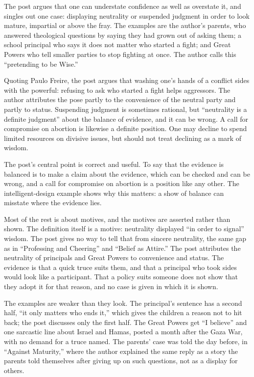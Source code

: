 \begin{afterword}
\summaryhead

The post argues that one can understate confidence as well as overstate it, and singles out one case: displaying neutrality or suspended judgment in order to look mature, impartial or above the fray. The examples are the author's parents, who answered theological questions by saying they had grown out of asking them; a school principal who says it does not matter who started a fight; and Great Powers who tell smaller parties to stop fighting at once. The author calls this ``pretending to be Wise.''

Quoting Paulo Freire, the post argues that washing one's hands of a conflict sides with the powerful: refusing to ask who started a fight helps aggressors. The author attributes the pose partly to the convenience of the neutral party and partly to status. Suspending judgment is sometimes rational, but ``neutrality is a definite judgment'' about the balance of evidence, and it can be wrong. A call for compromise on abortion is likewise a definite position. One may decline to spend limited resources on divisive issues, but should not treat declining as a mark of wisdom.

\responsehead

The post's central point is correct and useful. To say that the evidence is balanced is to make a claim about the evidence, which can be checked and can be wrong, and a call for compromise on abortion is a position like any other. The intelligent-design example shows why this matters: a show of balance can misstate where the evidence lies.

Most of the rest is about motives, and the motives are asserted rather than shown. The definition itself is a motive: neutrality displayed ``in order to signal'' wisdom. The post gives no way to tell that from sincere neutrality, the same gap as in ``Professing and Cheering'' and ``Belief as Attire.'' The post attributes the neutrality of principals and Great Powers to convenience and status. The evidence is that a quick truce suits them, and that a principal who took sides would look like a participant. That a policy suits someone does not show that they adopt it for that reason, and no case is given in which it is shown.

The examples are weaker than they look. The principal's sentence has a second half, ``it only matters who ends it,'' which gives the children a reason not to hit back; the post discusses only the first half. The Great Powers get ``I believe'' and one sarcastic line about Israel and Hamas, posted a month after the Gaza War, with no demand for a truce named. The parents' case was told the day before, in ``Against Maturity,'' where the author explained the same reply as a story the parents told themselves after giving up on such questions, not as a display for others.


\end{afterword}
